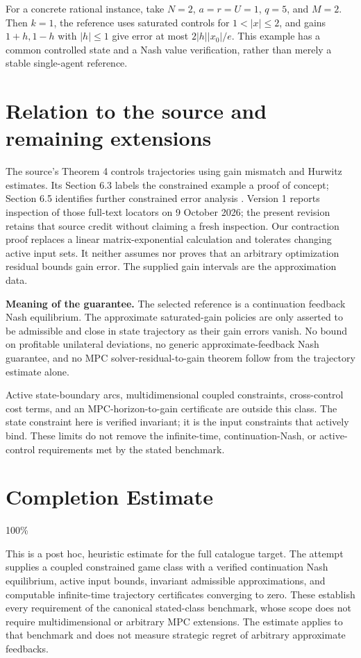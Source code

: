 \documentclass[11pt]{article}
\theoremstyle{remark}
\begin{document}
For a concrete rational instance, take $N=2$, $a=r=U=1$, $q=5$, and $M=2$. Then $k=1$, the reference uses saturated controls for $1<|x|\leq2$, and gains $1+h,1-h$ with $|h|\leq1$ give error at most $2|h||x_0|/e$. This example has a common controlled state and a Nash value verification, rather than merely a stable single-agent reference.

\section{Relation to the source and remaining extensions}
The source's Theorem 4 controls trajectories using gain mismatch and Hurwitz estimates. Its Section 6.3 labels the constrained example a proof of concept; Section 6.5 identifies further constrained error analysis \cite{varga}. Version 1 reports inspection of those full-text locators on 9 October 2026; the present revision retains that source credit without claiming a fresh inspection. Our contraction proof replaces a linear matrix-exponential calculation and tolerates changing active input sets. It neither assumes nor proves that an arbitrary optimization residual bounds gain error. The supplied gain intervals are the approximation data.

\textbf{Meaning of the guarantee.} The selected reference is a continuation feedback Nash equilibrium. The approximate saturated-gain policies are only asserted to be admissible and close in state trajectory as their gain errors vanish. No bound on profitable unilateral deviations, no generic approximate-feedback Nash guarantee, and no MPC solver-residual-to-gain theorem follow from the trajectory estimate alone.

Active state-boundary arcs, multidimensional coupled constraints, cross-control cost terms, and an MPC-horizon-to-gain certificate are outside this class. The state constraint here is verified invariant; it is the input constraints that actively bind. These limits do not remove the infinite-time, continuation-Nash, or active-control requirements met by the stated benchmark.

\section{Completion Estimate}
100\%

This is a post hoc, heuristic estimate for the full catalogue target.
The attempt supplies a coupled constrained game class with a verified continuation Nash equilibrium, active input bounds, invariant admissible approximations, and computable infinite-time trajectory certificates converging to zero. These establish every requirement of the canonical stated-class benchmark, whose scope does not require multidimensional or arbitrary MPC extensions. The estimate applies to that benchmark and does not measure strategic regret of arbitrary approximate feedbacks.
\end{document}
